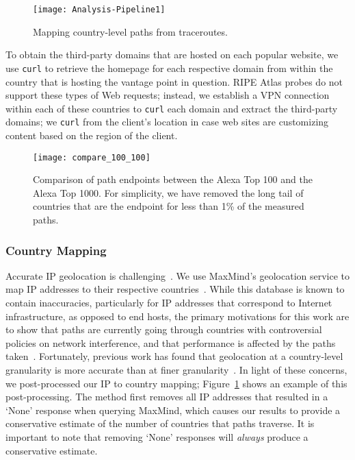 \begin{figure}[t]
\centering
\texttt{[image: Analysis-Pipeline1]}
\caption{Mapping country-level paths from traceroutes.}
\label{fig:analysis_pipeline}
\end{figure}

To obtain the third-party domains that are hosted on each popular website, we
use {\tt curl} to retrieve the homepage for each respective domain from within
the country that is hosting the vantage point in question.  RIPE Atlas probes
do not support these types of Web requests; instead, we establish a VPN
connection within each of these countries to {\tt curl} each domain and
extract the third-party domains; we {\tt curl} from the client's location in
case web sites are customizing content based on the region of the client.

\begin{figure}[t]
\centering
\texttt{[image: compare\_100\_100]}
\caption{Comparison of path endpoints between the Alexa Top 100 and the Alexa Top 1000. For simplicity, we have 
removed the long tail of countries that are the endpoint for less than 1\% of the measured paths.}
\label{fig:compare_alexas}
\end{figure}

\subsubsection{Country Mapping}
\label{c_map}

Accurate IP geolocation is challenging~\cite{poese2011ip,katz2006towards,eriksson2010learning,gill2010dude,hu2012towards,guo2009mining,eriksson2012posit}. We use MaxMind's
geolocation service to map IP addresses to their respective
countries~\cite{maxmind}. While this database is known to contain inaccuracies,
particularly for IP addresses that correspond to Internet infrastructure, as opposed
to end hosts, the primary motivations for this work are to show that paths 
are currently going through countries with controversial policies on network interference, and that performance is affected by the 
paths taken~\cite{huffaker2011geocompare}.  Fortunately, previous work has found that
geolocation at a country-level granularity is more accurate than at
finer granularity~\cite{huffaker2011geocompare}.  In light of these
concerns, we post-processed our IP to country mapping; Figure~\ref{fig:analysis_pipeline} shows an example of this
post-processing.  The method first removes all IP addresses that resulted in a `None' response when
querying MaxMind, which causes our results to provide a conservative
estimate of the number of countries that paths traverse. It is important
to note that removing `None' responses will \textit{always} produce a
conservative estimate.

